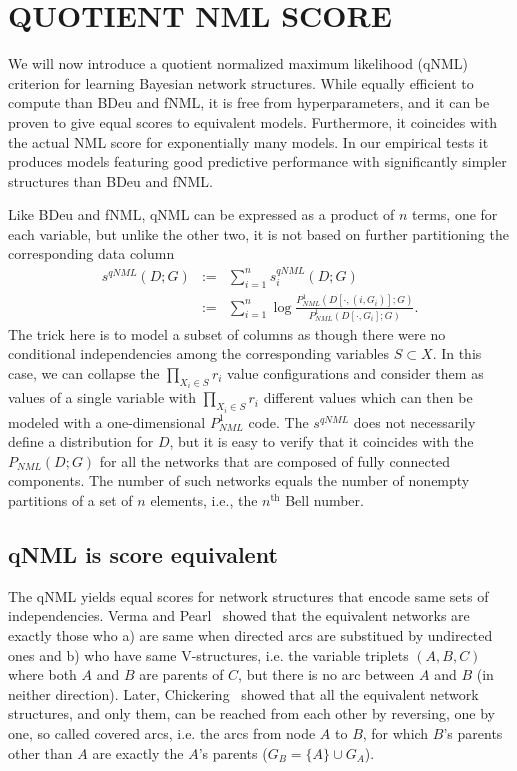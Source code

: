 \section{QUOTIENT NML SCORE}

We will now introduce a quotient normalized maximum likelihood (qNML)
criterion for learning Bayesian network structures.  While equally
efficient to compute than BDeu and fNML, it is free from
hyperparameters, and it can be proven to give equal scores to
equivalent models. Furthermore, it coincides with the actual NML score
for exponentially many models. In our empirical tests it produces
models featuring good predictive performance with significantly
simpler structures than BDeu and fNML.

Like BDeu and fNML, qNML can be expressed as a product of $n$ terms,
one for each variable, but unlike the other two, it is not based on
further partitioning the corresponding data column
\begin{eqnarray}
s^{qNML}(D;G) & := & \sum_{i=1}^n s^{qNML}_i(D;G)\\
& := & \sum_{i=1}^n \log \frac{P^1_{NML}(D[\cdot,(i,G_i)];G)}
                             {P^1_{NML}(D[\cdot,G_i];G)}.\nonumber
\end{eqnarray}
The trick here is to model a subset of columns as though there were no
conditional independencies among the corresponding variables $S
\subset X$.  In this case, we can collapse the $\prod_{X_i\in S} r_i$
value configurations and consider them as values of a single variable
with $\prod_{X_i\in S} r_i$ different values which can then be modeled
with a one-dimensional $P^1_{NML}$ code.  The $s^{qNML}$ does not
necessarily define a distribution for $D$, but it is easy to verify
that it coincides with the $P_{NML}(D;G)$ for all the networks that
are composed of fully connected components.  The number of such
networks equals the number of nonempty partitions of a set of $n$
elements, i.e., the $n^\text{th}$ Bell number.

\subsection {qNML is score equivalent}

The qNML yields equal scores for network structures that encode same
sets of independencies. Verma and Pearl~\cite{Verm90} showed that the
equivalent networks are exactly those who a) are same when directed
arcs are substitued by undirected ones and b) who have same
V-structures, i.e.  the variable triplets $(A,B,C)$ where both $A$ and
$B$ are parents of $C$, but there is no arc between $A$ and $B$ (in
neither direction).  Later, Chickering~\cite{Chick95} showed that all
the equivalent network structures, and only them, can be reached from
each other by reversing, one by one, so called covered arcs, i.e. the
arcs from node $A$ to $B$, for which $B$'s parents other than $A$ are
exactly the $A$'s parents ($G_B=\{A\}\cup G_A$).


